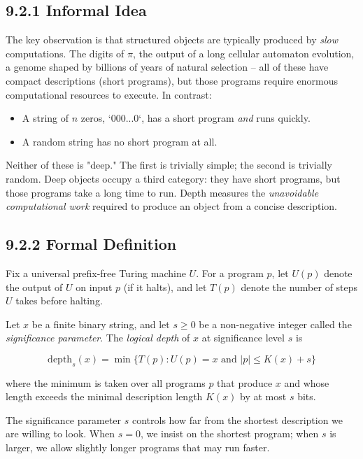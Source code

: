 \subsection{9.2.1 Informal Idea}

The key observation is that structured objects are typically produced by \textit{slow} computations. The digits of $\pi$, the output of a long cellular automaton evolution, a genome shaped by billions of years of natural selection -- all of these have compact descriptions (short programs), but those programs require enormous computational resources to execute. In contrast:

\begin{itemize}
\item A string of $n$ zeros, `000...0`, has a short program \textit{and} runs quickly.
\item A random string has no short program at all.
\end{itemize}

Neither of these is "deep." The first is trivially simple; the second is trivially random. Deep objects occupy a third category: they have short programs, but those programs take a long time to run. Depth measures the \textit{unavoidable computational work} required to produce an object from a concise description.

\subsection{9.2.2 Formal Definition}

Fix a universal prefix-free Turing machine $U$. For a program $p$, let $U(p)$ denote the output of $U$ on input $p$ (if it halts), and let $T(p)$ denote the number of steps $U$ takes before halting.

\begin{definition}
Let $x$ be a finite binary string, and let $s \geq 0$ be a non-negative integer called the \textit{significance parameter}. The \textit{logical depth} of $x$ at significance level $s$ is

\[\text{depth}_s(x) = \min \{ T(p) : U(p) = x \text{ and } |p| \leq K(x) + s \} \]

where the minimum is taken over all programs $p$ that produce $x$ and whose length exceeds the minimal description length $K(x)$ by at most $s$ bits.

The significance parameter $s$ controls how far from the shortest description we are willing to look. When $s = 0$, we insist on the shortest program; when $s$ is larger, we allow slightly longer programs that may run faster.
\end{definition}

